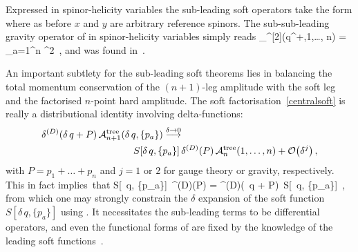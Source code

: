 Expressed in spinor-helicity variables the sub-leading soft operators take the form
%
%
where as before $x$ and $y$ are arbitrary reference spinors. The sub-sub-leading gravity
operator of  in spinor-helicity variables simply reads
%
\be
 _{}^{[2]}(q^{+},1,\ldots, n) = 
 \sum_{a=1}^{n}  ^{2}  \,,
\ee
%
and was found in~\cite{ch2_Cachazo:2014fwa}. 

An important subtlety for the sub-leading soft
theorems lies in balancing the total momentum conservation of the $(n+1)$-leg amplitude
with the soft leg and the factorised $n$-point hard amplitude. The
soft factorisation~\eqref{centralsoft} is really a distributional identity involving
delta-functions:
%
\begin{align}\begin{aligned}
\delta^{(D)}(\delta \, q + P) \, \mathcal{A}_{n+1}^{\text{tree}} (\delta \, q,\{p_{a}\}) \stackrel{\delta\to 0}{\longrightarrow}& \\
S[\delta \,  q,  \{p_{a}\}]\, & \delta^{(D)}(P)\,  \mathcal{A}_{n}^{\text{tree}}(1,\ldots , n)+ \mathcal{O}\bigl(\delta^{j}\bigr)\, ,
\end{aligned}\end{align}
%
with $P=p_{1}+\ldots + p_{n}$ and $j=1$ or $2$ for gauge theory or gravity, respectively. This
in fact implies~that
%
\be
S[\delta \,  q,  \{p_{a}\}]\,  \delta^{(D)}(P) = \delta^{(D)}(\delta \, q + P)\, 
S[\delta \,  q,  \{p_{a}\}]\, ,
\ee
%
from which one may strongly constrain the $\delta$ expansion  of the soft
function $S[\delta \,  q,  \{p_{a}\}]$ using .
It necessitates the sub-leading terms to be differential operators, and
even the functional forms of  are fixed by the knowledge of the leading soft functions~\cite{ch2_Broedel:2014fsa}.



